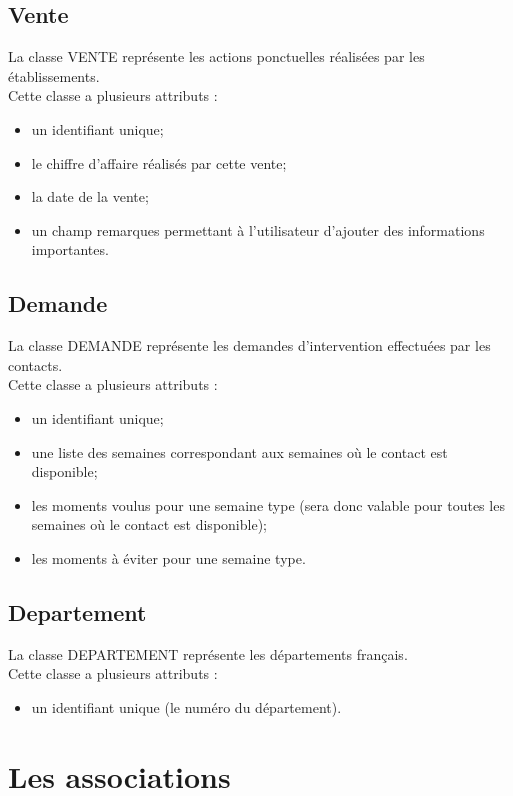 \documentclass[asi, sansVersion]{picInsa}
\begin{document}
\subsection*{Vente}
La classe VENTE représente les actions ponctuelles réalisées par les établissements.\\ 
Cette classe a plusieurs attributs : 
\begin{itemize}
\item un identifiant unique; 
\item le chiffre d'affaire réalisés par cette vente;
\item la date de la vente;
\item un champ remarques permettant à l'utilisateur d'ajouter des informations importantes. 
\end{itemize}

\subsection*{Demande}

La classe DEMANDE représente les demandes d'intervention effectuées par les contacts.\\
Cette classe a plusieurs attributs :
\begin{itemize}
\item un identifiant unique; 
\item une liste des semaines correspondant aux semaines où le contact est disponible; 
\item les moments voulus pour une semaine type (sera donc valable pour toutes les semaines où le contact est disponible);
\item les moments à éviter pour une semaine type. 
\end{itemize}

\subsection*{Departement}

La classe DEPARTEMENT représente les départements français.\\
Cette classe a plusieurs attributs :
\begin{itemize}
\item un identifiant unique (le numéro du département). 
\end{itemize}


\section{Les associations}
\end{document}
